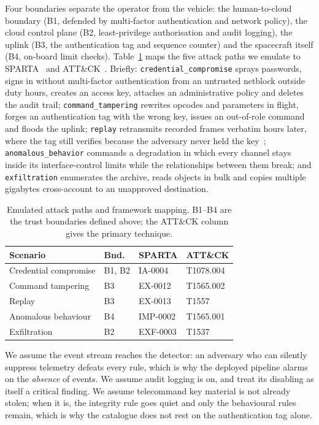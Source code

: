 \documentclass[10pt,journal]{IEEEtran}
\begin{document}
Four boundaries separate the operator from the vehicle: the human-to-cloud
boundary (B1, defended by multi-factor authentication and network policy), the
cloud control plane (B2, least-privilege authorisation and audit logging), the
uplink (B3, the authentication tag and sequence counter) and the spacecraft
itself (B4, on-board limit checks). Table~\ref{tab:paths} maps the five attack paths we emulate to
SPARTA~\cite{sparta} and ATT\&CK~\cite{attack}. Briefly:
\texttt{credential\_compromise} sprays passwords, signs in without
multi-factor authentication from an untrusted netblock outside duty hours,
creates an access key, attaches an administrative policy and deletes the audit
trail; \texttt{command\_tampering} rewrites opcodes and parameters in flight,
forges an authentication tag with the wrong key, issues an out-of-role command
and floods the uplink; \texttt{replay} retransmits recorded frames verbatim
hours later, where the tag still verifies because the adversary never held the
key~\cite{syverson1994replay}; \texttt{anomalous\_behavior} commands a
degradation in which every channel stays inside its interface-control limits
while the relationships between them break; and \texttt{exfiltration}
enumerates the archive, reads objects in bulk and copies multiple gigabytes
cross-account to an unapproved destination.

\begin{table}[t]
\caption{Emulated attack paths and framework mapping. B1--B4 are the trust
boundaries defined above; the ATT\&CK column gives the primary technique.}
\label{tab:paths}
\centering
\footnotesize
\begin{tabular}{@{}llll@{}}
\toprule
\textbf{Scenario} & \textbf{Bnd.} & \textbf{SPARTA} & \textbf{ATT\&CK} \\
\midrule
Credential compromise & B1, B2 & IA-0004 & T1078.004 \\
Command tampering & B3 & EX-0012 & T1565.002 \\
Replay & B3 & EX-0013 & T1557 \\
Anomalous behaviour & B4 & IMP-0002 & T1565.001 \\
Exfiltration & B2 & EXF-0003 & T1537 \\
\bottomrule
\end{tabular}
\end{table}

We assume the event stream reaches the detector: an adversary who can silently
suppress telemetry defeats every rule, which is why the deployed pipeline alarms
on the \emph{absence} of events. We assume audit logging is on, and treat its
disabling as itself a critical finding. We assume telecommand key material is
not already stolen; when it is, the integrity rule goes quiet and only the
behavioural rules remain, which is why the catalogue does not rest on the
authentication tag alone.
\end{document}
